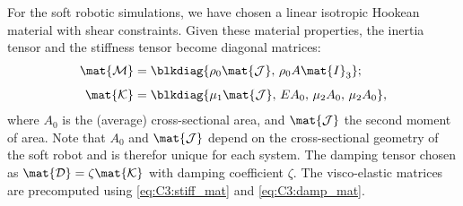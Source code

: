 For the soft robotic simulations, we have chosen a linear isotropic Hookean material with shear constraints. %
Given these material properties, the inertia tensor and the stiffness tensor become diagonal matrices:
%
\begin{align*}
\mat{\mathcal{M}} & = \blkdiag{ \rho_0 \mat{\mathcal{J}},\, \rho_0 A \mat{I}_3}; \\[0.45em]
\mat{\mathcal{K}} & = \blkdiag{\mu_1 \mat{\mathcal{J}},\, E A_0,\, \mu_2  A_0,\,\mu_2  A_0},
\end{align*}
%
\editl where $A_0$ is the (average) cross-sectional area, and $\mat{\mathcal{J}}$ the second moment of area. Note that $A_0$ and $\mat{\mathcal{J}}$ depend on the cross-sectional geometry of the soft robot and is therefor unique for each system. \editl The damping tensor chosen as $\mat{\mathcal{D}} = \zeta \mat{\mathcal{K}}$ with damping coefficient $\zeta$. The visco-elastic matrices are precomputed using \eqref{eq:C3:stiff_mat} and \eqref{eq:C3:damp_mat}.

